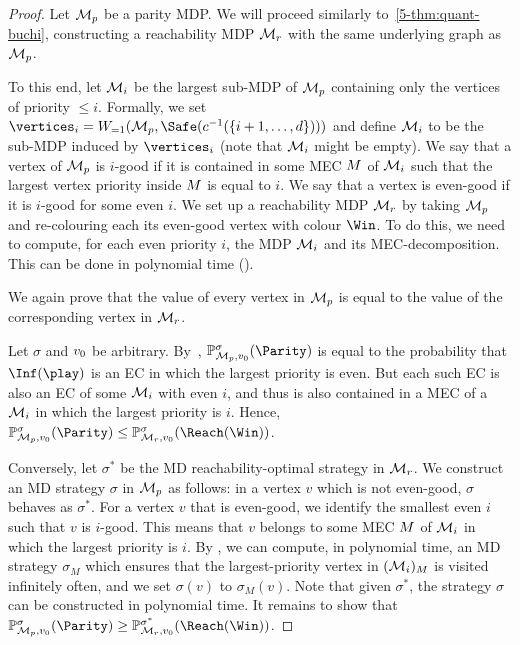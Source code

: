 \begin{proof}
Let $\mathcal{M}_p$ be a parity MDP. We will proceed similarly to~\cref{5-thm:quant-buchi}, constructing a reachability MDP $\mathcal{M}_r$ with the same underlying graph as $\mathcal{M}_p$.

To this end, let $\mathcal{M}_i$ be the largest sub-MDP of $\mathcal{M}_p$ containing only the vertices of priority $\leq i$. Formally, we set $\vertices_i = \winAS(\mdp_p,\Safe(\colouring^{-1}(\{i+1,\ldots,d\})) )$ and define $\mathcal{M}_i$ to be the sub-MDP induced by $\vertices_i$ (note that $\mathcal{M}_i$ might be empty). We say that a vertex of $\mathcal{M}_p$ is $i$-good if it is contained in some MEC $M$ of $\mathcal{M}_i$ such that the largest vertex priority inside $M$ is equal to $i$. We say that a vertex is even-good if it is $i$-good for some even $i$. We set up a reachability MDP $\mathcal{M}_r$ by taking $\mathcal{M}_p$ and re-colouring each its even-good vertex with colour $\Win$. To do this, we need to compute, for each even priority $i$, the MDP $\mathcal{M}_i$ and its MEC-decomposition. This can be done in polynomial time (). 

We again prove that the value of every vertex in $\mathcal{M}_p$ is equal to the value of the corresponding vertex in $\mathcal{M}_r$.

Let $\sigma$ and $v_0$ be arbitrary. By~, $\probm^\sigma_{\mdp_p,\vinit}(\Parity)$ is equal to the probability that $\Inf(\play)$  is an EC in which the largest priority is even. But each such EC is also an EC of some $\mathcal{M}_i$ with even $i$, and thus is also contained in a MEC of a $\mathcal{M}_i$ in which the largest priority is $ i $. Hence, $\probm^\sigma_{\mdp_p,\vinit}(\Parity)\leq \probm^\sigma_{\mdp_r,\vinit}(\Reach(\Win))$.

Conversely, let $\sigma^*$ be the MD reachability-optimal strategy in $\mathcal{M}_r$. We construct an MD strategy $\sigma$ in $\mathcal{M}_p$ as follows: in a vertex $v$ which is not even-good, $\sigma$ behaves as $\sigma^*$. For a vertex $v$ that is even-good, we identify the smallest even $i$ such that $v$ is $i$-good. 
This means that $v$ belongs to some MEC $M$ of $\mathcal{M}_i$ in which the largest priority is $i$. 
By , we can compute, in polynomial time, an MD strategy $\sigma_M$ which ensures that the largest-priority vertex in $(\mathcal{M}_i)_M$ is visited infinitely often, and we set $\sigma(v)$ to $\sigma_M(v)$. Note that given $\sigma^*$, the strategy $\sigma$ can be constructed in polynomial time. It remains to show that $\probm^\sigma_{\mdp_p,\vinit}(\Parity)\geq \probm^{\sigma^*}_{\mdp_r,\vinit}(\Reach(\Win))$.


\end{proof}
